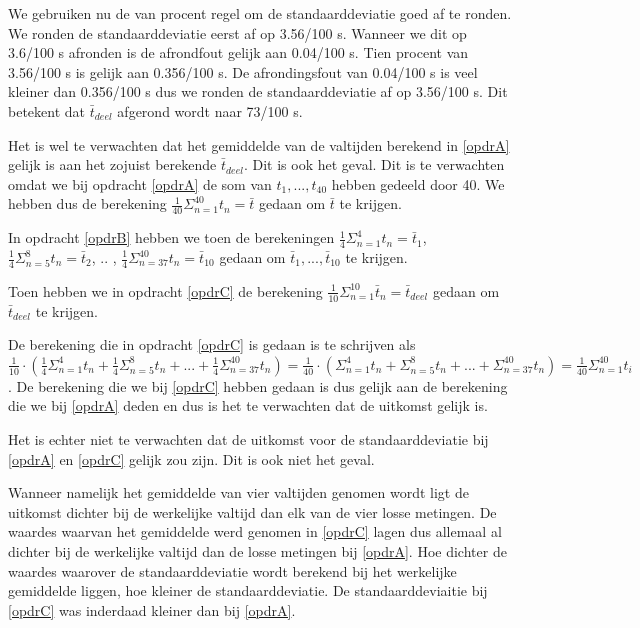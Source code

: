 \documentclass[12pt, dutch, a4paper]{article}
\theoremstyle{definition}
\begin{document}
\begin{enumerate}[(a.)]
We gebruiken nu de van procent regel om de standaarddeviatie goed af te ronden. We ronden de standaarddeviatie eerst af op 3.56/100 s. Wanneer we dit op 3.6/100 s afronden is de afrondfout gelijk aan 0.04/100 s. Tien procent van 3.56/100 s is gelijk aan 0.356/100 s. De afrondingsfout van 0.04/100 s is veel kleiner dan 0.356/100 s dus we ronden de standaarddeviatie af op 3.56/100 s. Dit betekent dat $\bar t_{deel}$ afgerond wordt naar 73/100 s. 

Het is wel te verwachten dat het gemiddelde van de valtijden berekend in \ref{opdrA} gelijk is aan het zojuist berekende $\bar t_{deel}$. Dit is ook het geval. Dit is te verwachten omdat we bij opdracht \ref{opdrA} de som van $t_1, ..., t_{40}$ hebben gedeeld door 40. We hebben dus de berekening $\frac{1}{40}\Sigma_{n=1}^{40} t_n = \bar t$ gedaan om $\bar t$ te krijgen. 

In opdracht \ref{opdrB} hebben we toen de berekeningen $\frac{1}{4}\Sigma_{n=1}^{4} t_n = \bar t_1$, $\frac{1}{4}\Sigma_{n=5}^{8} t_n = \bar t_2$, .. , $\frac{1}{4}\Sigma_{n=37}^{40} t_n = \bar t_{10}$ gedaan om $\bar t_1, ..., \bar t_{10}$ te krijgen. 

Toen hebben we in opdracht \ref{opdrC} de berekening $\frac{1}{10}\Sigma_{n=1}^{10} \bar t_n = \bar t_{deel}$ gedaan om $\bar t_{deel}$ te krijgen. 

De berekening die in opdracht \ref{opdrC} is gedaan is te schrijven als $\frac{1}{10} \cdot (\frac{1}{4}\Sigma_{n=1}^{4} t_n + \frac{1}{4}\Sigma_{n=5}^{8} t_n + ... + \frac{1}{4}\Sigma_{n=37}^{40} t_n) = \frac{1}{40} \cdot (\Sigma_{n=1}^{4} t_n + \Sigma_{n=5}^{8} t_n + ... + \Sigma_{n=37}^{40} t_n) =  \frac{1}{40} \Sigma_{n=1}^{40} t_i$. De berekening die we bij \ref{opdrC} hebben gedaan is dus gelijk aan de berekening die we bij \ref{opdrA} deden en dus is het te verwachten dat de uitkomst gelijk is.

Het is echter niet te verwachten dat de uitkomst voor de standaarddeviatie bij \ref{opdrA} en \ref{opdrC} gelijk zou zijn. Dit is ook niet het geval. 

Wanneer namelijk het gemiddelde van vier valtijden genomen wordt ligt de uitkomst dichter bij de werkelijke valtijd dan elk van de vier losse metingen. De waardes waarvan het gemiddelde werd genomen in \ref{opdrC} lagen dus allemaal al dichter bij de werkelijke valtijd dan de losse metingen bij \ref{opdrA}. Hoe dichter de waardes waarover de standaarddeviatie wordt berekend bij het werkelijke gemiddelde liggen, hoe kleiner de standaarddeviatie. De standaarddeviaitie bij \ref{opdrC} was inderdaad kleiner dan bij \ref{opdrA}.


\end{enumerate}
\end{document}
